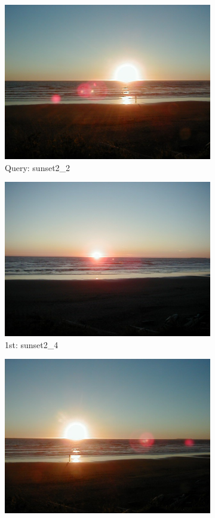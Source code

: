 \documentclass[10pt, a4paper]{article}
\begin{document}
\begin{itemize}
\begin{figure}[H]
	\centering
	\begin{subfigure}{0.25\textwidth}
	  \centering
	  \includegraphics[width=0.9\linewidth]{../input/sunset2_2.jpg}
	  \caption{Query: sunset2\_2}
	\end{subfigure}%
	\begin{subfigure}{0.25\textwidth}
	  \centering
	  \includegraphics[width=0.9\linewidth]{../input/sunset2_4.jpg}
	  \caption{1st: sunset2\_4}
	\end{subfigure}%
	\begin{subfigure}{0.25\textwidth}
        \centering
        \includegraphics[width=0.9\linewidth]{../input/sunset2_3.jpg}

\end{subfigure}
\end{figure}
\end{itemize}
\end{document}
